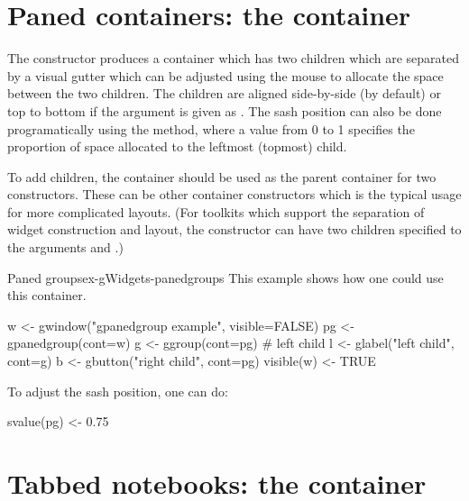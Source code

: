 \section{Paned containers: the  container}
\label{sec:gWidgets-gpanedgroup-container}

The  constructor produces a container which
has two children which are separated by a visual gutter which can be adjusted using
the mouse to allocate the space between the two children. The children are aligned side-by-side (by default) or
top to bottom if the  argument is
given as . The sash position can
also be done programatically using the 
method, where  a value from 0 to 1 specifies the proportion of space allocated to the leftmost (topmost) child.

To add children, the container should be used as the parent container
for two constructors. These can be other container constructors which
is the typical usage for more complicated layouts.
(For toolkits which support the separation of widget
construction and layout, the  constructor can
have two children specified to the arguments
 and .)

\begin{example}{Paned groups}{ex-gWidgets-panedgroups}
  This example shows how one could use this container.
\begin{Schunk}
\begin{Sinput}
 w <- gwindow("gpanedgroup example", visible=FALSE)
 pg <- gpanedgroup(cont=w)
 g <- ggroup(cont=pg)                  # left child
 l <- glabel("left child", cont=g)
 b <- gbutton("right child", cont=pg)
 visible(w) <- TRUE
\end{Sinput}
\end{Schunk}
To adjust the sash position, one can do:
\begin{Schunk}
\begin{Sinput}
 svalue(pg) <- 0.75
\end{Sinput}
\end{Schunk}
\end{example}


  
\section{Tabbed notebooks: the  container}
\label{sec:gWidgets-gnotebook}

